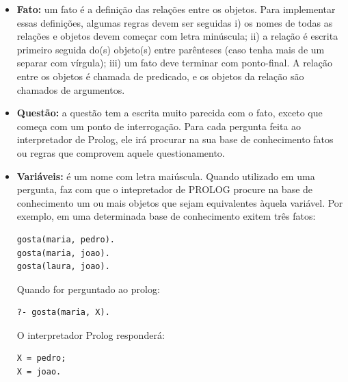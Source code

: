\begin{itemize}
\item \textbf{Fato:} um fato é a definição das relações entre os objetos. Para implementar essas definições, algumas regras devem ser seguidas i) os nomes de todas as relações e objetos devem começar com letra minúscula; ii) a relação é escrita primeiro seguida do(s) objeto(s) entre parênteses (caso tenha mais de um separar com vírgula); iii) um fato deve terminar com ponto-final. A relação entre os objetos é chamada de predicado, e os objetos da relação são chamados de argumentos.
\item \textbf{Questão:} a questão tem a escrita muito parecida com o fato, exceto que começa com um ponto de interrogação. Para cada pergunta feita ao interpretador de Prolog, ele irá procurar na sua base de conhecimento fatos ou regras que comprovem aquele questionamento. 
\item \textbf{Variáveis:} é um nome com letra maiúscula. Quando utilizado em uma pergunta, faz com que o intepretador de PROLOG procure na base de conhecimento um ou mais objetos que sejam equivalentes àquela variável. Por exemplo, em uma determinada base de conhecimento exitem três fatos: 

\lstset{language=Prolog}
\begin{lstlisting}
gosta(maria, pedro).
gosta(maria, joao). 
gosta(laura, joao).
\end{lstlisting}

Quando for perguntado ao prolog:
\lstset{language=Prolog}
\begin{lstlisting}
?- gosta(maria, X).
\end{lstlisting}

O interpretador Prolog responderá:
\lstset{language=Prolog}
\begin{lstlisting}
X = pedro;
X = joao.
\end{lstlisting}


\end{itemize}
